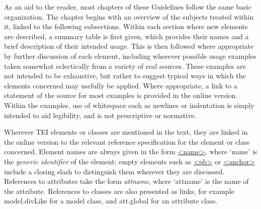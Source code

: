 As an aid to the reader, most chapters of these Guidelines follow the same basic organization. The chapter begins with an overview of the subjects treated within it, linked to the following subsections. Within each section where new elements are described, a summary table is first given, which provides their names and a brief description of their intended usage. This is then followed where appropriate by further discussion of each element, including wherever possible usage examples taken somewhat eclectically from a variety of real sources. These examples are not intended to be exhaustive, but rather to suggest typical ways in which the elements concerned may usefully be applied. Where appropriate, a link to a statement of the source for most examples is provided in the online version. Within the examples, use of whitespace such as newlines or indentation is simply intended to aid legibility, and is not prescriptive or normative. \par
Wherever TEI elements or classes are mentioned in the text, they are linked in the online version to the relevant reference specification for the element or class concerned. Element names are always given in the form \hyperref[TEI.name]{<name>}, where ‘name’ is the \textit{generic identifier} of the element; empty elements such as \hyperref[TEI.pb]{<pb>} or \hyperref[TEI.anchor]{<anchor>} include a closing slash to distinguish them wherever they are discussed. References to attributes take the form {\itshape attname}, where ‘attname’ is the name of the attribute. References to classes are also presented as links, for example \textsf{model.divLike} for a model class, and \textsf{att.global} for an attribute class.
